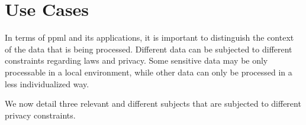 
\section{Use Cases}
\label{sec:UseCases}


In terms of \ac{ppml} and its applications, it is important to distinguish the context of the data that is being processed. Different data can be subjected to different constraints regarding laws and privacy. Some sensitive data may be only processable in a local environment, while other data can only be processed in a less individualized way.

We now detail three relevant and different subjects that are subjected to different privacy constraints.

